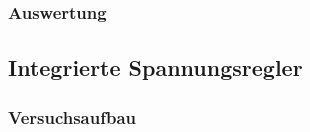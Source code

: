 \documentclass[12pt,a4paper]{article}
\begin{document}
\subsubsection{Auswertung}
\subsection{Integrierte Spannungsregler}
\subsubsection{Versuchsaufbau}
\end{document}
